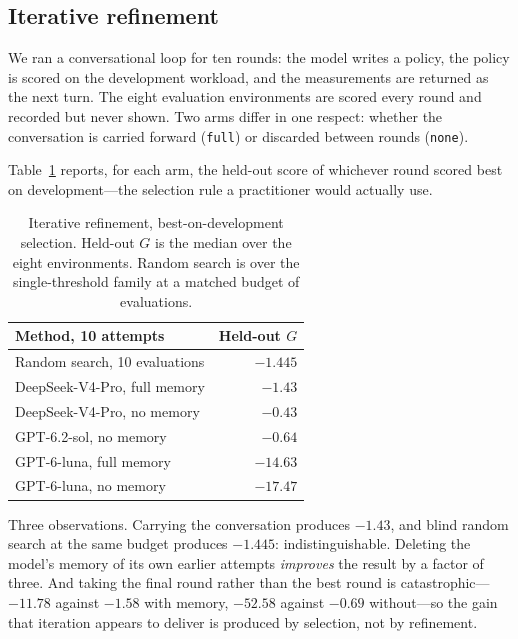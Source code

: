 \documentclass[conference]{IEEEtran}
\newcommand{\G}{\ensuremath{G}}
\begin{document}
\subsection{Iterative refinement}

We ran a conversational loop for ten rounds: the model writes a policy, the policy is
scored on the development workload, and the measurements are returned as the next turn.
The eight evaluation environments are scored every round and recorded but never shown.
Two arms differ in one respect: whether the conversation is carried forward
(\texttt{full}) or discarded between rounds (\texttt{none}).

Table~\ref{tab:iterative} reports, for each arm, the held-out score of whichever round
scored best on development---the selection rule a practitioner would actually use.

\begin{table}[t]
\caption{Iterative refinement, best-on-development selection. Held-out $\G$ is the median
over the eight environments. Random search is over the single-threshold family at a
matched budget of evaluations.}
\label{tab:iterative}
\centering
\begin{tabular}{lr}
\toprule
Method, 10 attempts & Held-out \G \\
\midrule
Random search, 10 evaluations      & $-1.445$ \\
DeepSeek-V4-Pro, full memory       & $-1.43$ \\
DeepSeek-V4-Pro, no memory         & $-0.43$ \\
GPT-6.2-sol, no memory\footnotemark[1] & $-0.64$ \\
GPT-6-luna, full memory            & $-14.63$ \\
GPT-6-luna, no memory              & $-17.47$ \\
\bottomrule
\end{tabular}
\end{table}

Three observations. Carrying the conversation produces $-1.43$, and blind random search at
the same budget produces $-1.445$: indistinguishable. Deleting the model's memory of its
own earlier attempts \emph{improves} the result by a factor of three. And taking the final
round rather than the best round is catastrophic---$-11.78$ against $-1.58$ with memory,
$-52.58$ against $-0.69$ without---so the gain that iteration appears to deliver is
produced by selection, not by refinement.
\end{document}
